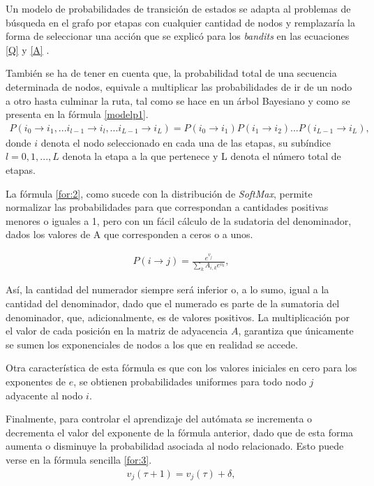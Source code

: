 Un modelo de probabilidades de transición de estados se adapta al problemas de búsqueda en el grafo por etapas con cualquier cantidad de nodos y remplazaría la forma de seleccionar una acción que se explicó para los \textit{bandits} en las ecuaciones \ref{Q} y \ref{A} \citep{sutton1998introduction}.

También se ha de tener en cuenta que, la probabilidad total de una secuencia determinada de nodos, equivale a multiplicar las probabilidades de ir de un nodo a otro hasta culminar la ruta, tal como se hace en un árbol Bayesiano y como se presenta en la fórmula \ref{modelp1}.
\begin{eqnarray}
\label{modelp1}
P(i_{0} \to i_{1}, ... i_{l-1} \to i_{l}, ... i_{L-1} \to i_{L})=P(i_{0} \to i_{1})P(i_{1} \to i_{2})...P(i_{L-1} \to i_{L}),
\end{eqnarray}
donde $i$ denota el nodo seleccionado en cada una de las etapas, su subíndice $l=0,1,...,L$ denota la etapa a la que pertenece y L denota el número total de etapas. 

La fórmula \ref{for:2}, como sucede con la distribución de \textit{SoftMax}, permite normalizar las probabilidades para que correspondan a cantidades positivas menores o iguales a 1, pero con un fácil cálculo de la sudatoria del denominador, dados los valores de A que corresponden a ceros o a unos. 

\begin{eqnarray}\label{for:2}
P(i \to j) = \frac{e^{v_j}}{\sum_k A_{i,k} e^{v_k}},
\end{eqnarray}


Así, la cantidad del numerador siempre será inferior o,  a lo sumo, igual a la cantidad del denominador, dado que el numerado es parte de la sumatoria del denominador, que, adicionalmente, es de valores positivos. La multiplicación por el valor de cada posición en la matriz de adyacencia $A$, garantiza que únicamente se sumen los exponenciales de nodos a los que en realidad se accede. 

Otra característica de esta fórmula es que con los valores iniciales en cero para los exponentes de $e$, se obtienen probabilidades uniformes para todo nodo $j$ adyacente al nodo $i$.

Finalmente, para controlar el aprendizaje del autómata se incrementa o decrementa el valor del exponente de la fórmula anterior, dado que de esta forma aumenta o disminuye la probabilidad asociada al nodo relacionado. Esto puede verse en la fórmula sencilla \ref{for:3}.
\begin{eqnarray}\label{for:3}
v_j(\tau + 1) = v_j(\tau) + \delta,
\end{eqnarray}

